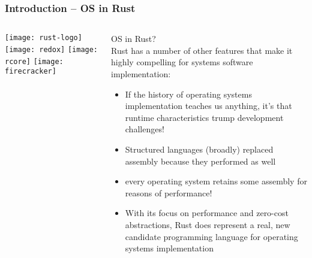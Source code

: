 \begin{frame}[plain]
	\frametitle{Introduction -- OS in Rust}
	
	
	
	\begin{columns}
		
		\begin{column}{.2\textwidth}
			
			\texttt{[image: rust-logo]}
			\texttt{[image: redox]}
			\texttt{[image: rcore]}
			\texttt{[image: firecracker]}
		\end{column}
		
		\begin{column}{.8\textwidth}
			
			OS in Rust? \\
			Rust has a number of other features that make it highly
			compelling for systems software implementation:
			
			\begin{itemize}
				
				\item  If the history of operating systems implementation teaches us
				anything, it’s that runtime characteristics trump development
				challenges!
				
				\item  Structured languages (broadly) replaced assembly because
				they performed as well
				
				\item every operating system retains some assembly for reasons
				of performance!
				
				\item With its focus on performance and zero-cost abstractions, Rust
				does represent a real, new candidate programming language
				for operating systems implementation
				
			\end{itemize}
			
		\end{column}
		
		
	\end{columns}
	
	
\end{frame}



